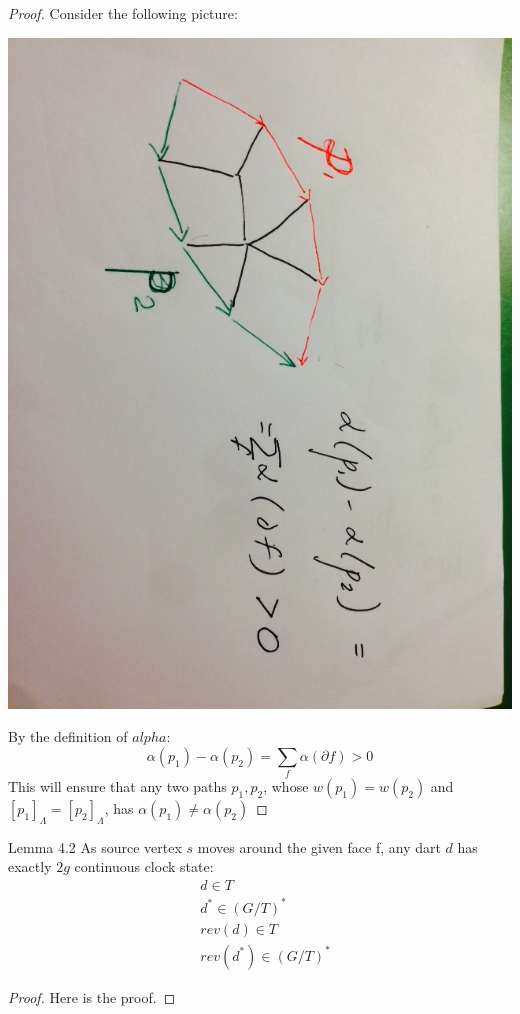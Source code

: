 \documentclass{article}
\begin{document}
\begin{proof}
Consider the following picture:
\begin{center}
\includegraphics[angle = 90, scale = 0.3]{figures/alphaNec.jpg}
\end{center}
By the definition of $alpha$:
\[\alpha(p_1) - \alpha(p_2) = \sum_f \alpha(\partial f) > 0\]
This will ensure that any two paths $p_1, p_2$, whose $w(p_1) = w(p_2)$ and 
$[p_1]_{\Lambda} = [p_2]_{\Lambda}$, has $\alpha(p_1) \neq \alpha(p_2)$

\end{proof}

\begin{oneshot}{Lemma 4.2}
As source vertex $s$ moves around the given face f, any dart $d$ has exactly
$2g$ continuous clock state: 
\begin{align}
& d \in T \\
& d^{*} \in (G/T)^{*} \\
& rev(d) \in T \\
& rev(d^{*}) \in (G/T)^{*}
\end{align}
\end{oneshot}
\begin{proof}
Here is the proof.
\end{proof}
\end{document}
